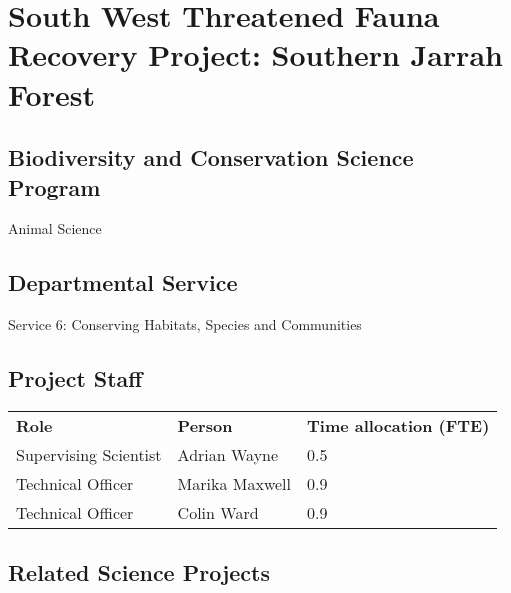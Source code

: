 \documentclass[version=last,
    paper=a4,                               %
    10pt,                                   %
    dvipsnames,
    oneside,                              %
    headings=openany,                       %
    open=any,
    BCOR=7mm,                               %
    DIV=15,     %
]{scrbook}
\begin{document}
\frontmatter
\maketitle
\mainmatter



\section*{South West Threatened Fauna Recovery Project: Southern Jarrah Forest
}



\subsection*{Biodiversity and Conservation Science Program}

Animal Science




\subsection*{Departmental Service}

Service 6: Conserving Habitats, Species and Communities


\subsection*{Project Staff}
\begin{tabu} {X X X}
\textbf{Role} & \textbf{Person} & \textbf{Time allocation (FTE)}\\

Supervising Scientist & Adrian Wayne & 0.5\\

Technical Officer & Marika Maxwell & 0.9\\

Technical Officer & Colin Ward & 0.9\\

\end{tabu}




\subsection*{Related Science Projects}
\end{document}
